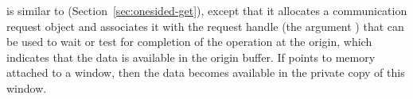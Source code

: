 
 is similar to 
(Section~\ref{sec:onesided-get}), except that it
allocates a communication request object and associates it with the
request handle (the argument ) that can be used to wait
or test for completion of the operation at the origin, which indicates that the
data is available in the origin buffer. If
 points to memory attached to a window, then the
data becomes available in the private copy of this window.

